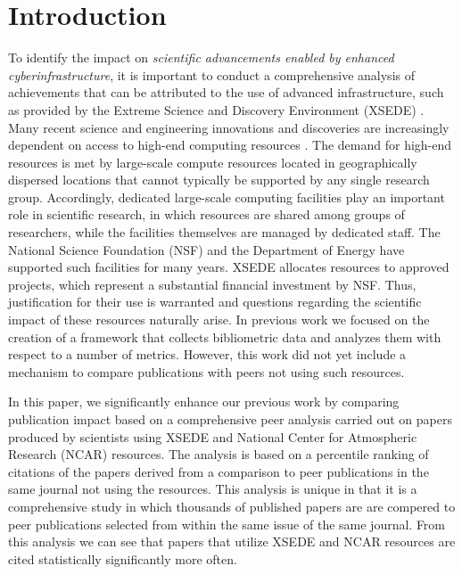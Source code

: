 \documentclass[10pt, conference, compsocconf]{IEEEtran}
\begin{document}

\section{Introduction} 

To identify the impact on {\em scientific advancements enabled by enhanced cyberinfrastructure}, it is important to conduct a comprehensive analysis of achievements that can be attributed to the use of advanced infrastructure, such as provided by the Extreme Science and Discovery Environment (XSEDE) \cite{www-xsede,xsede}. Many recent science and engineering innovations and discoveries are increasingly dependent on access to high-end computing resources \cite{las14impact}. The demand for high-end resources is met by large-scale compute resources located in geographically dispersed locations that cannot typically be supported by any single research group. Accordingly, dedicated large-scale computing facilities play an important role in scientific research, in which resources are shared among groups of researchers, while the facilities themselves are managed by dedicated staff. The National Science Foundation (NSF) and the Department of Energy have supported such facilities for many years. XSEDE allocates resources to approved projects, which represent a substantial financial investment by NSF. Thus, justification for their use is warranted and questions regarding the scientific impact of these resources naturally arise. In previous work \cite{las14impact} we focused on the creation of a framework that collects bibliometric data and analyzes them with respect to a number of metrics. However, this work did not yet include a mechanism to compare publications with peers not using such resources.

In this paper, we significantly enhance our previous work by comparing publication impact based on a comprehensive peer analysis carried out on papers produced by scientists using XSEDE and National Center for Atmospheric Research (NCAR) resources. The analysis is based on a percentile ranking of citations of the papers derived from a comparison to peer publications in the same journal not using the resources.  This analysis is unique in that it is a comprehensive study in which thousands of published papers are are compered to peer publications selected from within the same issue of the same journal. From this analysis we can see that papers that utilize XSEDE and NCAR resources are cited statistically significantly more often.  
\end{document}
